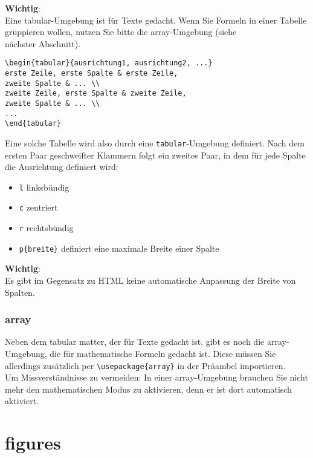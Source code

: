 \textbf{Wichtig}:\\

Eine tabular-Umgebung ist für Texte gedacht. Wenn Sie Formeln in einer Tabelle gruppieren wollen, nutzen Sie bitte die array-Umgebung (siehe \\nächster Abschnitt).

\begin{verbatim}
\begin{tabular}{ausrichtung1, ausrichtung2, ...}
erste Zeile, erste Spalte & erste Zeile, 
zweite Spalte & ... \\
zweite Zeile, erste Spalte & zweite Zeile, 
zweite Spalte & ... \\
...
\end{tabular}
\end{verbatim}

Eine solche Tabelle wird also durch eine \verb|tabular|-Umgebung definiert. Nach dem ersten Paar geschweifter Klammern folgt ein zweites Paar, in dem für jede Spalte die Ausrichtung definiert wird:

\begin{itemize}
	\item \verb|l| linksbündig
	\item \verb|c| zentriert
	\item \verb|r| rechtsbündig
	\item \verb|p{breite}| definiert eine maximale Breite einer Spalte
\end{itemize}

\textbf{Wichtig}:\\

Es gibt im Gegensatz zu HTML keine automatische Anpassung der Breite von Spalten.

\subsubsection{array}

Neben dem tabular matter, der für Texte gedacht ist, gibt es noch die array-Umgebung, die für mathematische Formeln gedacht ist. Diese müssen Sie allerdings zusätzlich per \verb|\usepackage{array}| in der Präambel importieren.\\

Um Missverständnisse zu vermeiden: In einer array-Umgebung brauchen Sie nicht mehr den mathematischen Modus zu aktivieren, denn er ist dort automatisch aktiviert.

\section{figures}

